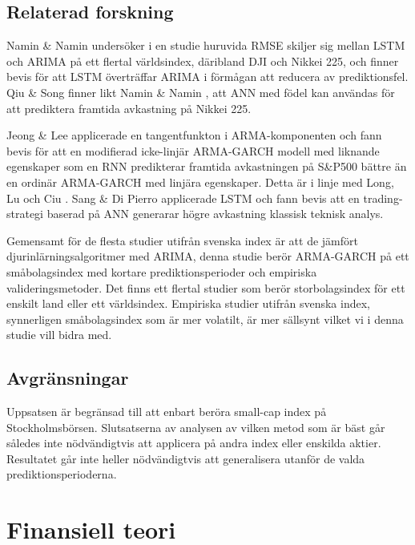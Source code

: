 \documentclass[12pt]{article}
\begin{document}
\subsection{Relaterad forskning}

Namin \& Namin \parencite*{siaminamini2018forecasting} undersöker i en studie huruvida RMSE skiljer sig mellan LSTM och ARIMA på ett flertal världsindex, däribland DJI och Nikkei 225, och finner bevis för att LSTM överträffar ARIMA i förmågan att reducera av prediktionsfel. Qiu \& Song \parencite*{10.1371/journal.pone.0155133} finner likt Namin \& Namin \parencite*{siaminamini2018forecasting}, att ANN med födel kan användas för att prediktera framtida avkastning på Nikkei 225. 

Jeong \& Lee \parencite*{jeong2019recurrent} applicerade en tangentfunkton i ARMA-komponenten och fann bevis för att en modifierad icke-linjär ARMA-GARCH modell med liknande egenskaper som en RNN predikterar framtida avkastningen på S\&P500 bättre än en ordinär ARMA-GARCH med linjära egenskaper. Detta är i linje med Long, Lu och Ciu \parencite*{long2019deep}. Sang \& Di Pierro \parencite*{sang2019improving} applicerade LSTM och fann bevis att en trading-strategi baserad på ANN generarar högre avkastning klassisk teknisk analys. 

Gemensamt för de flesta studier utifrån svenska index är att de jämfört djurinlärningsalgoritmer med ARIMA, denna studie berör ARMA-GARCH på ett småbolagsindex med kortare prediktionsperioder och empiriska valideringsmetoder. Det finns ett flertal studier som berör storbolagsindex för ett enskilt land eller ett världsindex. Empiriska studier utifrån svenska index, synnerligen småbolagsindex som är mer volatilt, är mer sällsynt vilket vi i denna studie vill bidra med. 

 
\subsection{Avgränsningar}
Uppsatsen är begränsad till att enbart beröra small-cap index på Stockholmsbörsen. Slutsatserna av analysen av vilken metod som är bäst går således inte nödvändigtvis att applicera på andra index eller enskilda aktier. Resultatet går inte heller nödvändigtvis att generalisera utanför de valda prediktionsperioderna.

\section{Finansiell teori}
\end{document}

